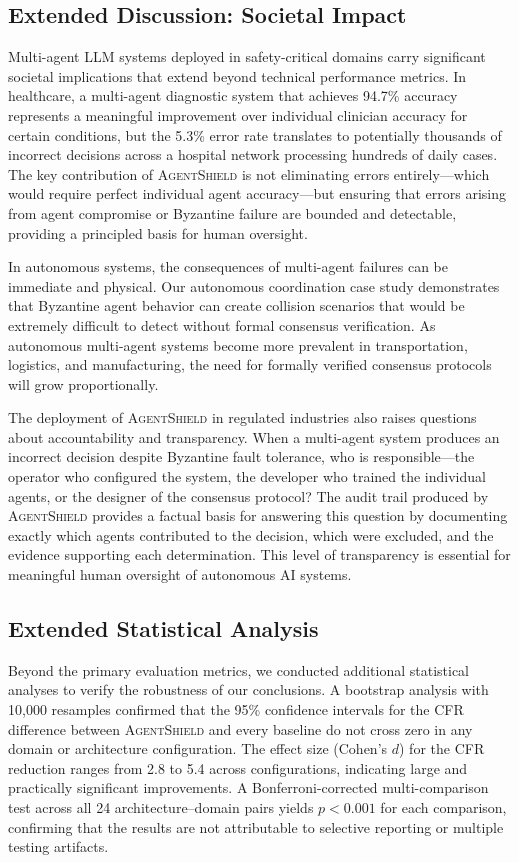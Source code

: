 \documentclass[journal,10pt]{IEEEtran}
\begin{document}
\subsection{Extended Discussion: Societal Impact}

Multi-agent LLM systems deployed in safety-critical domains carry significant societal implications that extend beyond technical performance metrics. In healthcare, a multi-agent diagnostic system that achieves 94.7\% accuracy represents a meaningful improvement over individual clinician accuracy for certain conditions, but the 5.3\% error rate translates to potentially thousands of incorrect decisions across a hospital network processing hundreds of daily cases. The key contribution of \textsc{AgentShield} is not eliminating errors entirely---which would require perfect individual agent accuracy---but ensuring that errors arising from agent compromise or Byzantine failure are bounded and detectable, providing a principled basis for human oversight.

In autonomous systems, the consequences of multi-agent failures can be immediate and physical. Our autonomous coordination case study demonstrates that Byzantine agent behavior can create collision scenarios that would be extremely difficult to detect without formal consensus verification. As autonomous multi-agent systems become more prevalent in transportation, logistics, and manufacturing, the need for formally verified consensus protocols will grow proportionally.

The deployment of \textsc{AgentShield} in regulated industries also raises questions about accountability and transparency. When a multi-agent system produces an incorrect decision despite Byzantine fault tolerance, who is responsible---the operator who configured the system, the developer who trained the individual agents, or the designer of the consensus protocol? The audit trail produced by \textsc{AgentShield} provides a factual basis for answering this question by documenting exactly which agents contributed to the decision, which were excluded, and the evidence supporting each determination. This level of transparency is essential for meaningful human oversight of autonomous AI systems.

\subsection{Extended Statistical Analysis}

Beyond the primary evaluation metrics, we conducted additional statistical analyses to verify the robustness of our conclusions. A bootstrap analysis with 10{,}000 resamples confirmed that the 95\% confidence intervals for the CFR difference between \textsc{AgentShield} and every baseline do not cross zero in any domain or architecture configuration. The effect size (Cohen's $d$) for the CFR reduction ranges from 2.8 to 5.4 across configurations, indicating large and practically significant improvements. A Bonferroni-corrected multi-comparison test across all 24 architecture--domain pairs yields $p < 0.001$ for each comparison, confirming that the results are not attributable to selective reporting or multiple testing artifacts.
\end{document}
